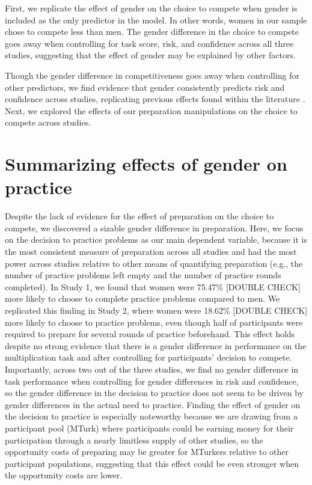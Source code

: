 \documentclass[a4paper,nobind]{templates/ociamthesis}
\begin{document}
First, we replicate the effect of gender on the choice to compete when gender is included as the only predictor in the model. In other words, women in our sample chose to compete less than men. The gender difference in the choice to compete goes away when controlling for task score, risk, and confidence across all three studies, suggesting that the effect of gender may be explained by other factors.

Though the gender difference in competitiveness goes away when controlling for other predictors, we find evidence that gender consistently predicts risk and confidence across studies, replicating previous effects found within the literature \autocite{Croson2009,Dohmen2011b,Eckel2008,Bertrand2010a,Bertrand2010,Lundeberg1994,Mobius2011,Barber2001}. Next, we explored the effects of our preparation manipulations on the choice to compete across studies.

\hypertarget{summarizing-effects-of-gender-on-practice}{%
\section{Summarizing effects of gender on practice}\label{summarizing-effects-of-gender-on-practice}}

Despite the lack of evidence for the effect of preparation on the choice to compete, we discovered a sizable gender difference in preparation. Here, we focus on the decision to practice problems as our main dependent variable, because it is the most consistent measure of preparation across all studies and had the most power across studies relative to other means of quantifying preparation (e.g., the number of practice problems left empty and the number of practice rounds completed). In Study 1, we found that women were 75.47\% {[}DOUBLE CHECK{]} more likely to choose to complete practice problems compared to men. We replicated this finding in Study 2, where women were 18.62\% {[}DOUBLE CHECK{]} more likely to choose to practice problems, even though half of participants were required to prepare for several rounds of practice beforehand. This effect holds despite no strong evidence that there is a gender difference in performance on the multiplication task and after controlling for participants' decision to compete. Importantly, across two out of the three studies, we find no gender difference in task performance when controlling for gender differences in risk and confidence, so the gender difference in the decision to practice does not seem to be driven by gender differences in the actual need to practice. Finding the effect of gender on the decision to practice is especially noteworthy because we are drawing from a participant pool (MTurk) where participants could be earning money for their participation through a nearly limitless supply of other studies, so the opportunity costs of preparing may be greater for MTurkers relative to other participant populations, suggesting that this effect could be even stronger when the opportunity costs are lower.
\end{document}
